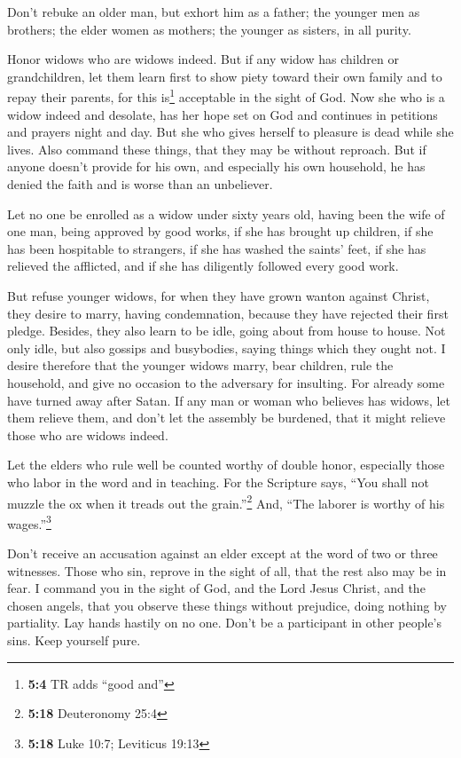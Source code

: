  Don't rebuke an older man, but exhort him as a father;
the younger men as brothers;  the elder women as mothers;
the younger as sisters, in all purity.

 Honor widows who are widows indeed.  But if
any widow has children or grandchildren, let them learn first to show
piety toward their own family and to repay their parents, for this
is\footnote{\textbf{5:4} TR adds ``good and''} acceptable in the sight
of God.  Now she who is a widow indeed and desolate, has
her hope set on God and continues in petitions and prayers night and
day.  But she who gives herself to pleasure is dead while
she lives.  Also command these things, that they may be
without reproach.  But if anyone doesn't provide for his
own, and especially his own household, he has denied the faith and is
worse than an unbeliever.

 Let no one be enrolled as a widow under sixty years old,
having been the wife of one man,  being approved by good
works, if she has brought up children, if she has been hospitable to
strangers, if she has washed the saints' feet, if she has relieved the
afflicted, and if she has diligently followed every good work.

 But refuse younger widows, for when they have grown
wanton against Christ, they desire to marry,  having
condemnation, because they have rejected their first pledge.
 Besides, they also learn to be idle, going about from
house to house. Not only idle, but also gossips and busybodies, saying
things which they ought not.  I desire therefore that the
younger widows marry, bear children, rule the household, and give no
occasion to the adversary for insulting.  For already
some have turned away after Satan.  If any man or woman
who believes has widows, let them relieve them, and don't let the
assembly be burdened, that it might relieve those who are widows indeed.

 Let the elders who rule well be counted worthy of double
honor, especially those who labor in the word and in teaching.
 For the Scripture says, ``You shall not muzzle the ox
when it treads out the grain.''\footnote{\textbf{5:18} Deuteronomy 25:4}
And, ``The laborer is worthy of his wages.''\footnote{\textbf{5:18} Luke
  10:7; Leviticus 19:13}

 Don't receive an accusation against an elder except at
the word of two or three witnesses.  Those who sin,
reprove in the sight of all, that the rest also may be in fear.
 I command you in the sight of God, and the Lord Jesus
Christ, and the chosen angels, that you observe these things without
prejudice, doing nothing by partiality.  Lay hands
hastily on no one. Don't be a participant in other people's sins. Keep
yourself pure.

